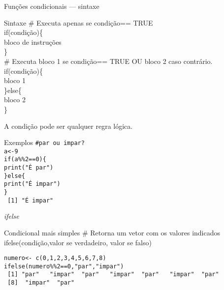 \documentclass[handout]{beamer}
\begin{document}
\begin{frame}{Funções condicionais --- sintaxe}

  \begin{block}{Sintaxe}
\# Executa apenas se condição== TRUE \\
if(condição)\{ \\
\hspace{10pt}  bloco de instruções\\
\}\\ \vspace{10pt}
\# Executa bloco 1 se condição== TRUE OU bloco 2 caso contrário.\\
if(condição)\{\\
\hspace{10pt}  bloco 1\\
\}else\{\\
\hspace{10pt}   bloco 2\\
\}\\    
  \end{block}
  \pause A condição pode ser qualquer regra lógica.
\end{frame}

\begin{frame}{Exemplos}
\texttt{\#par ou impar?\\
a<-9\\
if(a\%\%2==0)\{\\
\hspace{10pt}  print("É par")\\
  \}else\{\\
\hspace{10pt}   print("É impar")\\
  \}\\}
\pause
\texttt{~[1] "É impar"}
 \end{frame}
 \begin{frame}{\textit{ifelse}}
   \begin{block} {Condicional mais simples}
\# Retorna um vetor com os valores indicados\\
     ifelse(condição,valor se verdadeiro, valor se falso)\
   \end{block}
\pause
\texttt{numero<- c(0,1,2,3,4,5,6,7,8)\\
ifelse(numero\%\%2==0,"par","impar")\\
~[1] "par" ~  "impar"~ "par" ~  "impar"~ "par" ~  "impar"~ "par" \\ ~[8]~  "impar"~ "par" } 
 \end{frame}
\end{document}
